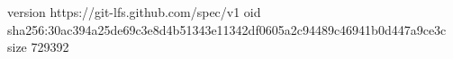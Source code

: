 version https://git-lfs.github.com/spec/v1
oid sha256:30ac394a25de69c3e8d4b51343e11342df0605a2c94489c46941b0d447a9ce3c
size 729392
